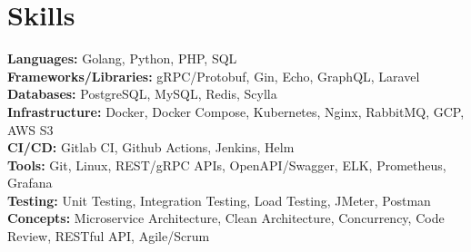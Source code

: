 \section{Skills}

\textbf{Languages:} Golang, Python, PHP, SQL \\
\textbf{Frameworks/Libraries:} gRPC/Protobuf, Gin, Echo, GraphQL, Laravel \\
\textbf{Databases:} PostgreSQL, MySQL, Redis, Scylla \\
\textbf{Infrastructure:} Docker, Docker Compose, Kubernetes, Nginx, RabbitMQ, GCP, AWS S3 \\
\textbf{CI/CD:} Gitlab CI, Github Actions, Jenkins, Helm \\
\textbf{Tools:} Git, Linux, REST/gRPC APIs, OpenAPI/Swagger, ELK, Prometheus, Grafana \\
\textbf{Testing:} Unit Testing, Integration Testing, Load Testing, JMeter, Postman \\
\textbf{Concepts:} Microservice Architecture, Clean Architecture, Concurrency, Code Review, RESTful API, Agile/Scrum \\

